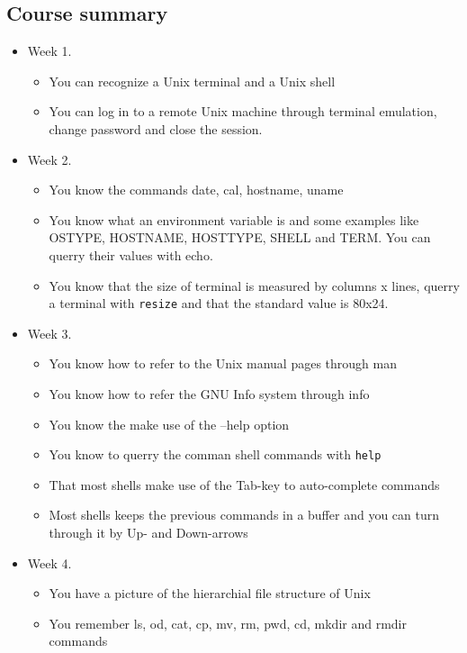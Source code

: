 \documentclass[11pt,a4paper,twoside]{article}
\begin{document}
\subsection*{Course summary}
\begin{itemize}
\item Week 1. 
\begin{itemize}
\item You can recognize a Unix terminal and a Unix shell
\item You can log in to a remote Unix machine through terminal emulation,
change password and close the session.
\end{itemize}

\item Week 2. 
\begin{itemize}
\item You know the commands date, cal, hostname, uname
\item You know what an environment variable is and some examples like OSTYPE,
HOSTNAME, HOSTTYPE, SHELL and TERM. You can querry their values with echo.
\item You know that the size of terminal is measured by columns x lines,
querry a terminal with \texttt{resize} and that the standard value is 80x24.
\end{itemize}

\item Week 3.
\begin{itemize}
\item You know how to refer to the Unix manual pages through man
\item You know how to refer the GNU Info system through info
\item You know the make use of the --help option
\item You know to querry the comman shell commands with \texttt{help}
\item That most shells make use of the Tab-key to auto-complete commands
\item Most shells keeps the previous commands in a buffer and you can
turn through it by Up- and Down-arrows
\end{itemize}

\item Week 4.
\begin{itemize}
\item You have a picture of the hierarchial file structure of Unix
\item You remember ls, od, cat, cp, mv, rm, pwd, cd, mkdir and rmdir 
commands
\end{itemize}
\end{itemize}
\end{document}
